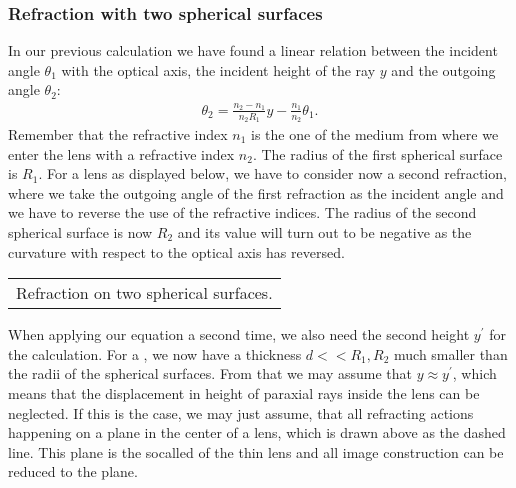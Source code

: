 \documentclass[letterpaper,10pt,english]{sphinxmanual}
\begin{document}
\subsubsection{Refraction with two spherical surfaces}
\label{\detokenize{notebooks/L3/Optical Elements:Refraction-with-two-spherical-surfaces}}
In our previous calculation we have found a linear relation between the incident angle \(\theta_1\) with the optical axis, the incident height of the ray \(y\) and the outgoing angle \(\theta_2\):
\begin{equation*}
\begin{split}\theta_2=\frac{n_2-n_1}{n_2 R_1}y -\frac{n_1}{n_2}\theta_1.\end{split}
\end{equation*}
Remember that the refractive index \(n_1\) is the one of the medium from where we enter the lens with a refractive index \(n_2\). The radius of the first spherical surface is \(R_1\). For a lens as displayed below, we have to consider now a second refraction, where we take the outgoing angle of the first refraction as the incident angle and we have to reverse the use of the refractive indices. The radius of the second spherical surface is now \(R_2\) and its value will turn out
to be negative as the curvature with respect to the optical axis has reversed.


\begin{savenotes}\sphinxattablestart
\centering
\begin{tabulary}{\linewidth}[t]{|T|}
\hline
\sphinxstyletheadfamily 
{}
\\
\hline
{} Refraction on two spherical surfaces.
\\
\hline
\end{tabulary}
\par
\sphinxattableend\end{savenotes}

When applying our equation a second time, we also need the second height \(y^{\prime}\) for the calculation. For a , we now have a thickness \(d<<R_1, R_2\) much smaller than the radii of the spherical surfaces. From that we may assume that \(y\approx y^{\prime}\), which means that the displacement in height of paraxial rays inside the lens can be neglected. If this is the case, we may just assume, that all refracting actions happening on a plane in the center of a lens,
which is drawn above as the dashed line. This plane is the so\sphinxhyphen{}called  of the thin lens and all image construction can be reduced to the plane.
\end{document}
